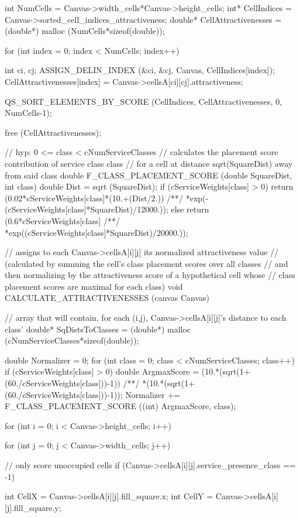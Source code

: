 \begin{C}
{	int NumCells = Canvas->width_cells*Canvas->height_cells;
	int* CellIndices = Canvas->sorted_cell_indices_attractiveness;
	double* CellAttractivenesses = (double*) malloc (NumCells*sizeof(double));
	
	for (int index = 0; index < NumCells; index++){
		
		int ci, cj;
		ASSIGN_DELIN_INDEX (&ci, &cj, Canvas, CellIndices[index]);
		CellAttractivenesses[index] = Canvas->cellsA[ci][cj].attractiveness;
	}
	
	QS_SORT_ELEMENTS_BY_SCORE (CellIndices, CellAttractivenesses, 0, NumCells-1);
	
	free (CellAttractivenesses);
}

// hyp: 0 <= class < cNumServiceClasses
// calculates the placement score contribution of service class class
// for a cell at distance sqrt(SquareDist) away from said class
double F_CLASS_PLACEMENT_SCORE (double SquareDist, int class){
	double Dist = sqrt (SquareDist);
	if (cServiceWeights[class] > 0)
		return (0.02*cServiceWeights[class]*(10.+(Dist/2.))
		/**/ *exp(-(cServiceWeights[class]*SquareDist)/12000.));
	else
		return (0.6*cServiceWeights[class]
		/**/ *exp((cServiceWeights[class]*SquareDist)/20000.));
}


// assigns to each Canvas->cellsA[i][j] its normalized attractiveness value
// (calculated by summing the cell's class placement scores over all classes
// and then normalizing by the attractiveness score of a hypothetical cell whose
// class placement scores are maximal for each class)
void CALCULATE_ATTRACTIVENESSES (canvas Canvas){
	
	// array that will contain, for each (i,j), Canvas->cellsA[i][j]'s distance to each class'
	double* SqDistsToClasses = (double*) malloc (cNumServiceClasses*sizeof(double));
	
	double Normalizer = 0;
	for (int class = 0; class < cNumServiceClasses; class++){
		if (cServiceWeights[class] > 0){
			double ArgmaxScore = (10.*(sqrt(1+(60./cServiceWeights[class]))-1))
			/**/ *(10.*(sqrt(1+(60./cServiceWeights[class]))-1));
			Normalizer += F_CLASS_PLACEMENT_SCORE ((int) ArgmaxScore, class);
		}
	}
	
	for (int i = 0; i < Canvas->height_cells; i++){
		for (int j = 0; j < Canvas->width_cells; j++){
			
			// only score unoccupied cells
			if (Canvas->cellsA[i][j].service_presence_class == -1){
				
				int CellX = Canvas->cellsA[i][j].fill_square.x;
				int CellY = Canvas->cellsA[i][j].fill_square.y;
				
}}}}
\end{C}
